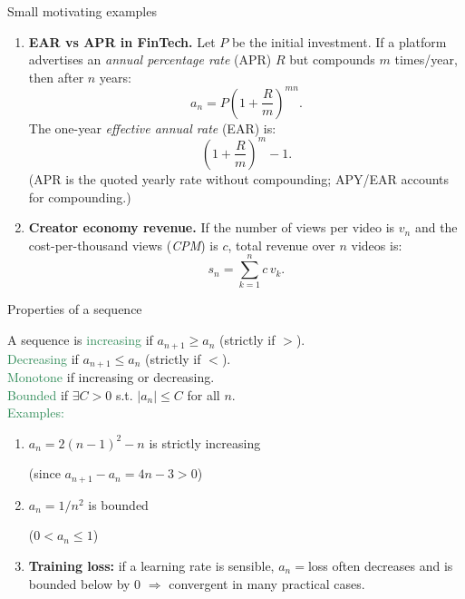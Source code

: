 \documentclass[11pt,aspectratio=169]{beamer}
\begin{document}
\begin{frame}{Small motivating examples}
\begin{enumerate}
\item \textbf{EAR vs APR in FinTech.}  
Let \( P \) be the initial investment. If a platform advertises an \textit{annual percentage rate} (APR) \( R \) but compounds \( m \) times/year, then after \( n \) years:
\[
a_n = P\left(1+\frac{R}{m}\right)^{mn}.
\]
The one-year \textit{effective annual rate} (EAR) is:
\[
\left(1+\frac{R}{m}\right)^m - 1.
\]
{\small (APR is the quoted yearly rate without compounding; APY/EAR accounts for compounding.)}\\[3mm]


\item \textbf{Creator economy revenue.}  
If the number of views per video is \( v_n \) and the cost-per-thousand views (\textit{CPM}) is \( c \),  
total revenue over \( n \) videos is:
\[
s_n = \sum_{k=1}^n c\,v_k.
\]
\end{enumerate}
\end{frame}

\begin{frame}{Properties of a sequence}

A sequence is \textcolor{SeaGreen}{increasing} if $a_{n+1}\ge a_n$ (strictly if $>$).\\[3mm]
\textcolor{SeaGreen}{Decreasing} if $a_{n+1}\le a_n$ (strictly if $<$).\\[3mm]
\textcolor{SeaGreen}{Monotone} if increasing or decreasing.\\[3mm]
\textcolor{SeaGreen}{Bounded} if $\exists C>0$ s.t. $|a_n|\le C$ for all $n$.\\[5mm]
\vskip 8pt
\textcolor{SeaGreen}{Examples:} 
\begin{enumerate}
\item $a_n=2(n-1)^2-n$ is strictly increasing \begin{tiny}(since $a_{n+1}-a_n=4n-3>0$)\end{tiny}
\item $a_n=1/n^2$ is bounded \begin{tiny}($0<a_n\le 1$)\end{tiny}
\item \textbf{Training loss:} if a learning rate is sensible, $a_n=$loss often decreases and is bounded below by $0$ $\Rightarrow$ convergent in many practical cases.
\end{enumerate}
\end{frame}
\end{document}
